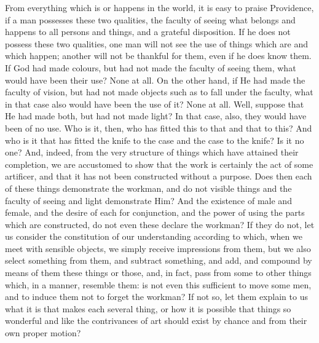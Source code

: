 \documentclass[a4paper]{article}
\begin{document}
From everything which is or happens in the world, it is easy to praise
Providence, if a man possesses these two qualities, the faculty of
seeing what belongs and happens to all persons and things, and a grateful
disposition. If he does not possess these two qualities, one man will
not see the use of things which are and which happen; another will
not be thankful for them, even if he does know them. If God had made
colours, but had not made the faculty of seeing them, what would have
been their use? None at all. On the other hand, if He had made the
faculty of vision, but had not made objects such as to fall under
the faculty, what in that case also would have been the use of it?
None at all. Well, suppose that He had made both, but had not made
light? In that case, also, they would have been of no use. Who is
it, then, who has fitted this to that and that to this? And who is
it that has fitted the knife to the case and the case to the knife?
Is it no one? And, indeed, from the very structure of things which
have attained their completion, we are accustomed to show that the
work is certainly the act of some artificer, and that it has not been
constructed without a purpose. Does then each of these things demonstrate
the workman, and do not visible things and the faculty of seeing and
light demonstrate Him? And the existence of male and female, and the
desire of each for conjunction, and the power of using the parts which
are constructed, do not even these declare the workman? If they do
not, let us consider the constitution of our understanding according
to which, when we meet with sensible objects, we simply receive impressions
from them, but we also select something from them, and subtract something,
and add, and compound by means of them these things or those, and,
in fact, pass from some to other things which, in a manner, resemble
them: is not even this sufficient to move some men, and to induce
them not to forget the workman? If not so, let them explain to us
what it is that makes each several thing, or how it is possible that
things so wonderful and like the contrivances of art should exist
by chance and from their own proper motion? 
\end{document}
